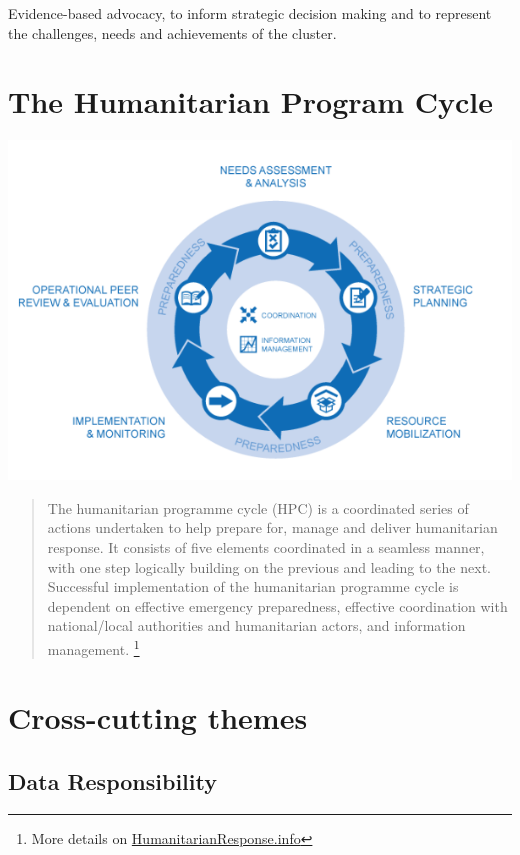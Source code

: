 \documentclass[
  a4paper,
  onecolumn,
  oneside]{book}
\begin{document}
Evidence-based advocacy, to inform strategic decision making and to
represent the challenges, needs and achievements of the cluster.

\hypertarget{the-humanitarian-program-cycle}{%
\section{The Humanitarian Program
Cycle}\label{the-humanitarian-program-cycle}}

\includegraphics{part2/images/HPCcycle.png}

\begin{quote}
The humanitarian programme cycle (HPC) is a coordinated series of
actions undertaken to help prepare for, manage and deliver humanitarian
response. It consists of five elements coordinated in a seamless manner,
with one step logically building on the previous and leading to the
next. Successful implementation of the humanitarian programme cycle is
dependent on effective emergency preparedness, effective coordination
with national/local authorities and humanitarian actors, and information
management. \footnote{More details on
  \href{https://www.humanitarianresponse.info/en/programme-cycle/space}{HumanitarianResponse.info}}
\end{quote}

\hypertarget{cross-cutting-themes}{%
\section{Cross-cutting themes}\label{cross-cutting-themes}}

\hypertarget{data-responsibility-1}{%
\subsection{Data Responsibility}\label{data-responsibility-1}}
\end{document}
